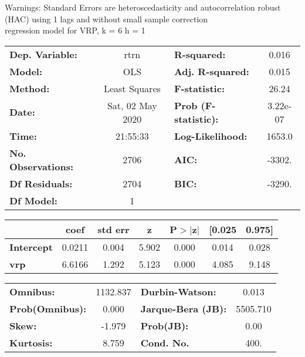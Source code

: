 Warnings: \newline
 [1] Standard Errors are heteroscedasticity and autocorrelation robust (HAC) using 1 lags and without small sample correction\\ 

regression model for VRP, k = 6 h = 1\begin{center}
\begin{tabular}{lclc}
\toprule
\textbf{Dep. Variable:}    &       rtrn       & \textbf{  R-squared:         } &     0.016   \\
\textbf{Model:}            &       OLS        & \textbf{  Adj. R-squared:    } &     0.015   \\
\textbf{Method:}           &  Least Squares   & \textbf{  F-statistic:       } &     26.24   \\
\textbf{Date:}             & Sat, 02 May 2020 & \textbf{  Prob (F-statistic):} &  3.22e-07   \\
\textbf{Time:}             &     21:55:33     & \textbf{  Log-Likelihood:    } &    1653.0   \\
\textbf{No. Observations:} &        2706      & \textbf{  AIC:               } &    -3302.   \\
\textbf{Df Residuals:}     &        2704      & \textbf{  BIC:               } &    -3290.   \\
\textbf{Df Model:}         &           1      & \textbf{                     } &             \\
\bottomrule
\end{tabular}
\begin{tabular}{lcccccc}
                   & \textbf{coef} & \textbf{std err} & \textbf{z} & \textbf{P$> |$z$|$} & \textbf{[0.025} & \textbf{0.975]}  \\
\midrule
\textbf{Intercept} &       0.0211  &        0.004     &     5.902  &         0.000        &        0.014    &        0.028     \\
\textbf{vrp}       &       6.6166  &        1.292     &     5.123  &         0.000        &        4.085    &        9.148     \\
\bottomrule
\end{tabular}
\begin{tabular}{lclc}
\textbf{Omnibus:}       & 1132.837 & \textbf{  Durbin-Watson:     } &    0.013  \\
\textbf{Prob(Omnibus):} &   0.000  & \textbf{  Jarque-Bera (JB):  } & 5505.710  \\
\textbf{Skew:}          &  -1.979  & \textbf{  Prob(JB):          } &     0.00  \\
\textbf{Kurtosis:}      &   8.759  & \textbf{  Cond. No.          } &     400.  \\
\bottomrule
\end{tabular}
\end{center}

